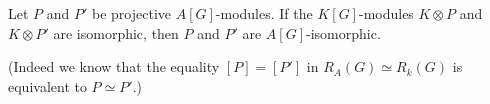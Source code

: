 Let $P$ and $P'$ be projective $A[G]$-modules. If the $K[G]$-modules $K \otimes P$ and $K \otimes P'$ are isomorphic, then $P$ and $P'$ are $A[G]$-isomorphic.

(Indeed we know that the equality $[P] = [P']$ in $R_A(G) \simeq R_k(G)$ is equivalent to $P \simeq P'$.)
